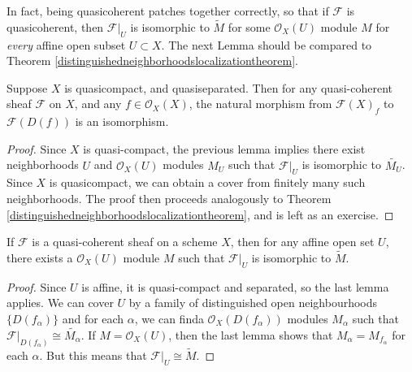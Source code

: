 In fact, being quasicoherent patches together correctly, so that if $\mathcal{F}$ is quasicoherent, then $\mathcal{F}|_U$ is isomorphic to $\tilde{M}$ for some $\mathcal{O}_X(U)$ module $M$ for \emph{every} affine open subset $U \subset X$. The next Lemma should be compared to Theorem \ref{distinguishedneighborhoodslocalizationtheorem}.

\begin{lemma}
    Suppose $X$ is quasicompact, and quasiseparated. Then for any quasi-coherent sheaf $\mathcal{F}$ on $X$, and any $f \in \mathcal{O}_X(X)$, the natural morphism from $\mathcal{F}(X)_f$ to $\mathcal{F}(D(f))$ is an isomorphism.
\end{lemma}
\begin{proof}
    Since $X$ is quasi-compact, the previous lemma implies there exist neighborhoods $U$ and $\mathcal{O}_X(U)$ modules $M_U$ such that $\mathcal{F}|_U$ is isomorphic to $\widetilde{M_U}$. Since $X$ is quasicompact, we can obtain a cover from finitely many such neighborhoods. The proof then proceeds analogously to Theorem \ref{distinguishedneighborhoodslocalizationtheorem}, and is left as an exercise.
\end{proof}

\begin{corollary}
    If $\mathcal{F}$ is a quasi-coherent sheaf on a scheme $X$, then for any affine open set $U$, there exists a $\mathcal{O}_X(U)$ module $M$ such that $\mathcal{F}|_U$ is isomorphic to $\widetilde{M}$.
\end{corollary}
\begin{proof}
    Since $U$ is affine, it is quasi-compact and separated, so the last lemma applies. We can cover $U$ by a family of distinguished open neighbourhoods $\{ D(f_\alpha) \}$ and for each $\alpha$, we can finda $\mathcal{O}_X(D(f_\alpha))$ modules $M_\alpha$ such that $\mathcal{F}|_{D(f_\alpha)} \cong \widetilde{M_\alpha}$. If $M = \mathcal{O}_X(U)$, then the last lemma shows that $M_\alpha = M_{f_\alpha}$ for each $\alpha$. But this means that $\mathcal{F}|_U \cong \widetilde{M}$.
\end{proof}

